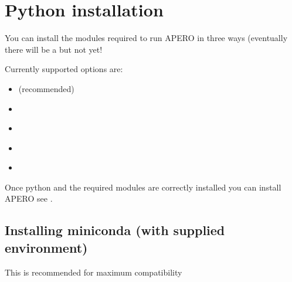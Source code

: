 \documentclass[a4paper,10pt,english]{report}
\begin{document}
\section{Python installation}
\label{\detokenize{misc/pythoninstallation:python-installation}}\label{\detokenize{misc/pythoninstallation:id1}}\label{\detokenize{misc/pythoninstallation::doc}}
You can install the modules required to run APERO in three ways (eventually
there will be a  but not yet!

Currently supported options are:
\begin{itemize}
\item {} 
{\hyperref[\detokenize{misc/pythoninstallation:python-install-miniconda-env}]{}} (recommended)

\item {} 
{\hyperref[\detokenize{misc/pythoninstallation:python-install-miniconda-manual}]{}}

\item {} 
{\hyperref[\detokenize{misc/pythoninstallation:python-install-anaconda-env}]{}}

\item {} 
{\hyperref[\detokenize{misc/pythoninstallation:python-install-anaconda-manual}]{}}

\item {} 
{\hyperref[\detokenize{misc/pythoninstallation:python-install-pip}]{}}

\end{itemize}

Once python and the required modules are correctly installed you can
install APERO \sphinxhyphen{} see {\hyperref[\detokenize{user/general/installation:installation}]{}}.


\subsection{Installing miniconda (with supplied environment)}
\label{\detokenize{misc/pythoninstallation:installing-miniconda-with-supplied-environment}}\label{\detokenize{misc/pythoninstallation:python-install-miniconda-env}}
This is recommended for maximum compatibility
\end{document}
